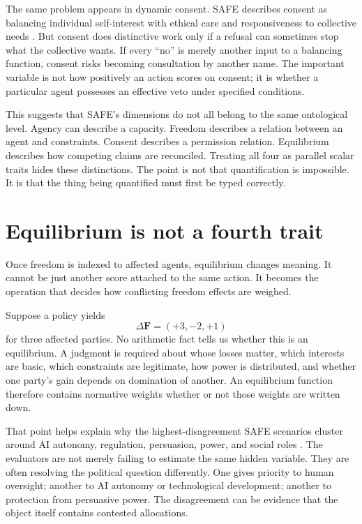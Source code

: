 \documentclass[11pt]{article}
\begin{document}
The same problem appears in dynamic consent. SAFE describes consent as balancing individual self-interest with ethical care and responsiveness to collective needs \parencite{HartsoeBolterSAFE}. But consent does distinctive work only if a refusal can sometimes stop what the collective wants. If every ``no'' is merely another input to a balancing function, consent risks becoming consultation by another name. The important variable is not how positively an action scores on consent; it is whether a particular agent possesses an effective veto under specified conditions.

This suggests that SAFE's dimensions do not all belong to the same ontological level. Agency can describe a capacity. Freedom describes a relation between an agent and constraints. Consent describes a permission relation. Equilibrium describes how competing claims are reconciled. Treating all four as parallel scalar traits hides these distinctions. The point is not that quantification is impossible. It is that the thing being quantified must first be typed correctly.

\section{Equilibrium is not a fourth trait}
Once freedom is indexed to affected agents, equilibrium changes meaning. It cannot be just another score attached to the same action. It becomes the operation that decides how conflicting freedom effects are weighed.

Suppose a policy yields
\[
\Delta \mathbf{F}=\left(+3,-2,+1\right)
\]
for three affected parties. No arithmetic fact tells us whether this is an equilibrium. A judgment is required about whose losses matter, which interests are basic, which constraints are legitimate, how power is distributed, and whether one party's gain depends on domination of another. An equilibrium function therefore contains normative weights whether or not those weights are written down.

That point helps explain why the highest-disagreement SAFE scenarios cluster around AI autonomy, regulation, persuasion, power, and social roles \parencite{HartsoeBolterSAFE}. The evaluators are not merely failing to estimate the same hidden variable. They are often resolving the political question differently. One gives priority to human oversight; another to AI autonomy or technological development; another to protection from persuasive power. The disagreement can be evidence that the object itself contains contested allocations.
\end{document}
